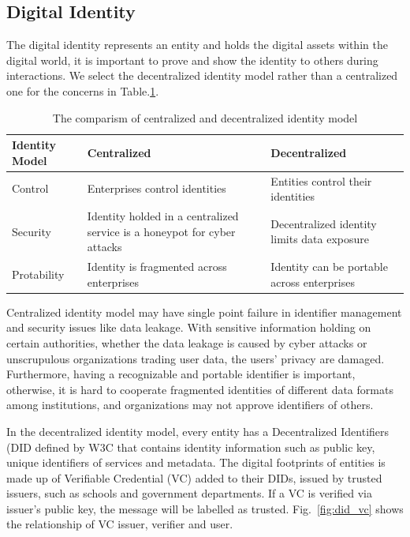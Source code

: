 \documentclass[conference]{IEEEtran}
\begin{document}
\subsection{Digital Identity}
The digital identity represents an entity and holds the digital assets within the digital world, it is important to prove and show the identity to others during interactions. We select the decentralized identity model rather than a centralized one for the concerns in Table.\ref{tab:did}.

\begin{table}[h]
	\caption{The comparism of centralized and decentralized identity model}
	\label{tab:did}
	\begin{tabularx}{\linewidth}{|l|X|X|}
	\hline
		\textbf{Identity Model} & \textbf{Centralized} & \textbf{Decentralized} \\
		\hline
		Control & Enterprises control identities & Entities control their identities \\
		\hline
		Security & Identity holded in a centralized service is a honeypot for cyber attacks & Decentralized identity limits data exposure \\
		\hline
		Protability & Identity is fragmented across enterprises & Identity can be portable across enterprises \\
		\hline
	\end{tabularx}
\end{table}

Centralized identity model may have single point failure in identifier management and security issues like data leakage. With sensitive information holding on certain authorities, whether the data leakage is caused by cyber attacks or unscrupulous organizations trading user data, the users' privacy are damaged. Furthermore, having a recognizable and portable identifier is important, otherwise, it is hard to cooperate fragmented identities of different data formats among institutions, and organizations may not approve identifiers of others.

In the decentralized identity model, every entity has a Decentralized Identifiers (DID\cite{DID} defined by W3C that contains identity information such as public key, unique identifiers of services and metadata. The digital footprints of entities is made up of Verifiable Credential (VC) added to their DIDs, issued by trusted issuers, such as schools and government departments. If a VC is verified via issuer's public key, the message will be labelled as trusted. Fig.~\ref{fig:did_vc} shows the relationship of VC issuer, verifier and user.
\end{document}
